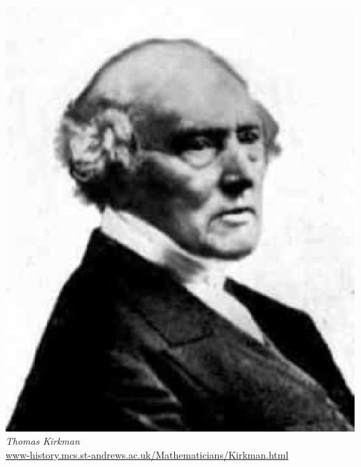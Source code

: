 \documentclass[letterpaper, 12pt]{article}
\begin{document}
\begin{center}
\includegraphics[scale=0.3]{Kirkman.eps}\\
\emph{{\small Thomas Kirkman}}\\
\href{http://www-history.mcs.st-andrews.ac.uk/Mathematicians/Kirkman.html}{www-history.mcs.st-andrews.ac.uk/Mathematicians/Kirkman.html}\\[1mm]

\end{center}
\end{document}
